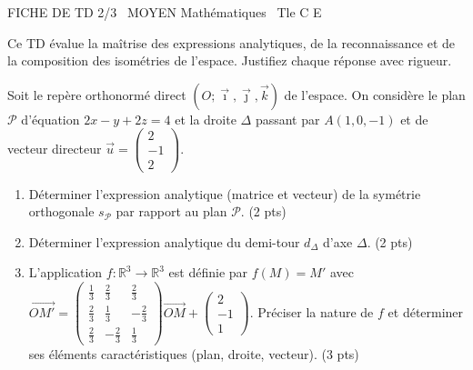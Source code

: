 \documentclass[11pt]{article}
\begin{document}
\begin{tcolorbox}[enhanced,colback=popink,colframe=popink,arc=10pt,boxrule=0pt,left=12pt,right=12pt,top=9pt,bottom=9pt]
{\color{white}\popxbold\small FICHE DE TD 2/3 \textbullet\ MOYEN \hfill Mathématiques \textbullet\ Tle C E\par}
\end{tcolorbox}
\vspace{4pt}
Ce TD évalue la maîtrise des expressions analytiques, de la reconnaissance et de la composition des isométries de l'espace. Justifiez chaque réponse avec rigueur.

\begin{exercice}
Soit le repère orthonormé direct $(O;\vec{\imath},\vec{\jmath},\vec{k})$ de l'espace. On considère le plan $\mathcal{P}$ d'équation $2x - y + 2z = 4$ et la droite $\Delta$ passant par $A(1,0,-1)$ et de vecteur directeur $\vec{u} = \begin{pmatrix} 2 \\ -1 \\ 2 \end{pmatrix}$.
\begin{enumerate}
    \item Déterminer l'expression analytique (matrice et vecteur) de la symétrie orthogonale $s_{\mathcal{P}}$ par rapport au plan $\mathcal{P}$. \hfill (2 pts)
    \item Déterminer l'expression analytique du demi-tour $d_{\Delta}$ d'axe $\Delta$. \hfill (2 pts)
    \item L'application $f : \mathbb{R}^3 \to \mathbb{R}^3$ est définie par $f(M) = M'$ avec $\overrightarrow{OM'} = \begin{pmatrix} \frac{1}{3} & \frac{2}{3} & \frac{2}{3} \\ \frac{2}{3} & \frac{1}{3} & -\frac{2}{3} \\ \frac{2}{3} & -\frac{2}{3} & \frac{1}{3} \end{pmatrix} \overrightarrow{OM} + \begin{pmatrix} 2 \\ -1 \\ 1 \end{pmatrix}$. 
    Préciser la nature de $f$ et déterminer ses éléments caractéristiques (plan, droite, vecteur). \hfill (3 pts)
\end{enumerate}
\end{exercice}
\end{document}
